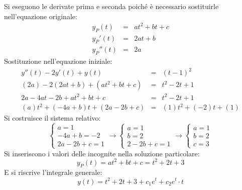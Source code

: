 \documentclass[a4paper]{article}
\begin{document}
	Si eseguono le derivate prima e seconda poiché è necessario sostituirle nell'equazione originale:
	\begin{equation*}
		\begin{array}{rcl}
			y_{P}\left(t\right) &=& at^{2} + bt + c \\ [.3em]
			y_{P}'\left(t\right) &=& 2at + b \\ [.3em]
			y_{P}''\left(t\right) &=& 2a
		\end{array}
	\end{equation*}
	Sostituzione nell'equazione iniziale:
	\begin{equation*}
		\begin{array}{rcl}
			y''\left(t\right) - 2y'\left(t\right) + y\left(t\right) &=& \left(t-1\right)^{2} \\ [.5em]
			\left(2a\right) - 2\left(2at + b\right) + \left(at^{2} + bt + c\right) &=& t^{2} -2t + 1 \\ [.5em]
			2a - 4at - 2b + at^{2} + bt + c &=& t^{2} -2t + 1 \\ [.5em]
			\left(a\right)t^{2} + \left(-4a + b\right)t + \left(2a - 2b + c\right) &=& \left(1\right)t^{2} + \left(-2\right)t + \left(1\right)
		\end{array}
	\end{equation*}
	Si costruisce il sistema relativo:
	\begin{equation*}
		\begin{cases}
			a = 1 \\ 
			-4a + b = -2 \\
			2a - 2b + c = 1
		\end{cases}
		\longrightarrow
		\begin{cases}
			a = 1 \\
			b = 2 \\
			2 - 2b + c = 1
		\end{cases}
		\longrightarrow
		\begin{cases}
			a = 1 \\
			b = 2 \\
			c = 3
		\end{cases}
	\end{equation*}
	Si inseriscono i valori delle incognite nella soluzione particolare:
	\begin{equation*}
		y_{P}\left(t\right) = at^{2} + bt + c = t^{2} + 2t + 3
	\end{equation*}
	E si riscrive l'integrale generale:
	\begin{equation*}
		y\left(t\right) = t^{2} + 2t + 3 + c_{1} e^{t} + c_{2} e^{t} \cdot t
	\end{equation*}\newpage
\end{document}
